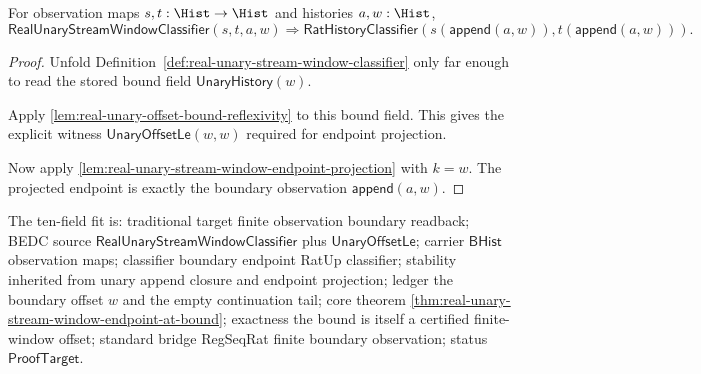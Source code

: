 \begin{theorem}
\label{thm:real-unary-stream-window-endpoint-at-bound}
For observation maps $s,t:\Hist\to\Hist$ and histories $a,w:\Hist$,
$$
\mathsf{RealUnaryStreamWindowClassifier}(s,t,a,w)
\Longrightarrow
\mathsf{RatHistoryClassifier}(
s(\mathsf{append}(a,w)),t(\mathsf{append}(a,w))).
$$
\end{theorem}
\begin{proof}
Unfold Definition~\ref{def:real-unary-stream-window-classifier} only far
enough to read the stored bound field $\mathsf{UnaryHistory}(w)$.

Apply \autoref{lem:real-unary-offset-bound-reflexivity} to this bound field.
This gives the explicit witness $\mathsf{UnaryOffsetLe}(w,w)$ required for
endpoint projection.

Now apply \autoref{lem:real-unary-stream-window-endpoint-projection} with
$k=w$. The projected endpoint is exactly the boundary observation
$\mathsf{append}(a,w)$.
\end{proof}

The ten-field fit is: traditional target finite observation boundary readback;
BEDC source $\mathsf{RealUnaryStreamWindowClassifier}$ plus
$\mathsf{UnaryOffsetLe}$; carrier $\mathsf{BHist}$ observation maps;
classifier boundary endpoint RatUp classifier; stability inherited from unary
append closure and endpoint projection; ledger the boundary offset $w$ and the
empty continuation tail; core theorem
\autoref{thm:real-unary-stream-window-endpoint-at-bound}; exactness the bound
is itself a certified finite-window offset; standard bridge RegSeqRat finite
boundary observation; status $\mathsf{ProofTarget}$.


